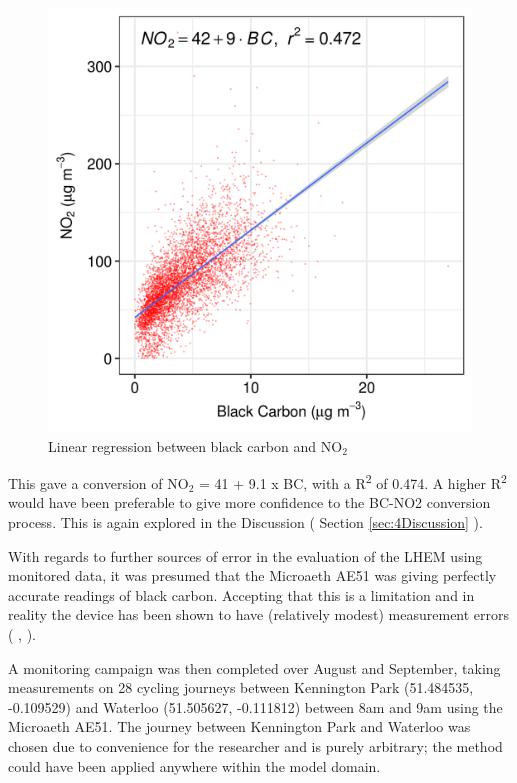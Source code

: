 \begin{figure}[H]
\centering
\includegraphics[scale=1]{images/black_carbon_no2_conversion.png}
\caption{Linear regression between black carbon and NO$_{2}$}
\label{fig:black_carbon_no2_conversion}
\end{figure}

This gave a conversion of NO$_{2}$ = 41 + 9.1 x BC, with a R\textsuperscript{2} of 0.474. A higher R\textsuperscript{2} would have been preferable to give more confidence to the BC-NO2 conversion process. This is again explored in the Discussion ( Section \ref{sec:4Discussion} ).

With regards to further sources of error in the evaluation of the LHEM using monitored data, it was presumed that the Microaeth AE51 was giving perfectly accurate readings of black carbon. Accepting that this is a limitation and in reality the device has been shown to have (relatively modest) measurement errors ( \cite{Cheng2013}, \cite{Viana2015} ).

A monitoring campaign was then completed over August and September, taking measurements on 28 cycling journeys between Kennington Park (51.484535, -0.109529) and Waterloo (51.505627, -0.111812) between 8am and 9am using the Microaeth AE51. The journey between Kennington Park and Waterloo was chosen due to convenience for the researcher and is purely arbitrary; the method could have been applied anywhere within the model domain.

